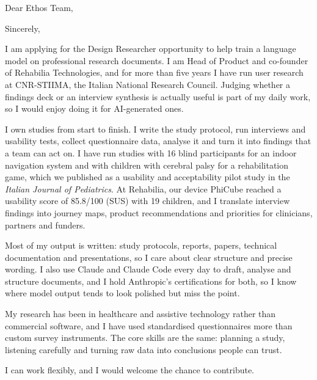 \documentclass[11pt,a4paper,sans]{moderncv}
\begin{document}

\opening{Dear Ethos Team,}
\closing{Sincerely,}
\makelettertitle

I am applying for the Design Researcher opportunity to help train a language model on professional research documents. I am Head of Product and co-founder of Rehabilia Technologies, and for more than five years I have run user research at CNR-STIIMA, the Italian National Research Council. Judging whether a findings deck or an interview synthesis is actually useful is part of my daily work, so I would enjoy doing it for AI-generated ones.

I own studies from start to finish. I write the study protocol, run interviews and usability tests, collect questionnaire data, analyse it and turn it into findings that a team can act on. I have run studies with 16 blind participants for an indoor navigation system and with children with cerebral palsy for a rehabilitation game, which we published as a usability and acceptability pilot study in the \textit{Italian Journal of Pediatrics}. At Rehabilia, our device PhiCube reached a usability score of 85.8/100 (SUS) with 19 children, and I translate interview findings into journey maps, product recommendations and priorities for clinicians, partners and funders.

Most of my output is written: study protocols, reports, papers, technical documentation and presentations, so I care about clear structure and precise wording. I also use Claude and Claude Code every day to draft, analyse and structure documents, and I hold Anthropic's certifications for both, so I know where model output tends to look polished but miss the point.

My research has been in healthcare and assistive technology rather than commercial software, and I have used standardised questionnaires more than custom survey instruments. The core skills are the same: planning a study, listening carefully and turning raw data into conclusions people can trust.

I can work flexibly, and I would welcome the chance to contribute.

\makeletterclosing
\end{document}
